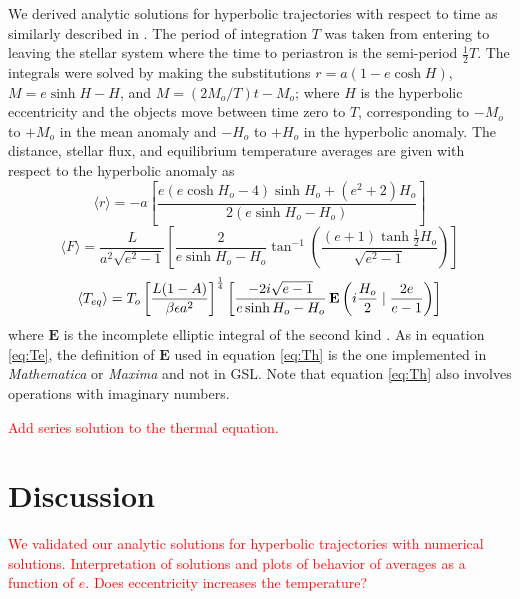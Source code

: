 \documentclass[a4paper,fleqn,usenatbib]{mnras}
\newcommand{\fix}{\textcolor{red}}
\begin{document}
We derived analytic solutions for hyperbolic trajectories with respect to time as similarly described in \citet{2017ApJ...837L...1M}. The period of integration $T$ was taken from entering to leaving the stellar system where the time to periastron is the semi-period $\frac{1}{2}T$. The integrals were solved by making the substitutions $r=a(1-e\cosh{H})$, $M=e\sinh{H} - H$, and $M=(2M_o/T)t - M_o$; where $H$ is the hyperbolic eccentricity and the objects move between time zero to $T$, corresponding to $-M_o$ to $+M_o$ in the mean anomaly and $-H_o$ to $+H_o$ in the hyperbolic anomaly. The distance, stellar flux, and equilibrium temperature averages are given with respect to the hyperbolic anomaly as
\begin{equation} \label{eq:rh}
\langle r \rangle = -a \left[\frac{e \left(e \cosh{H_o} - 4\right) \sinh{H_o} + \left(e^{2} + 2\right) H_o}{2\left(e \sinh{H_o} - H_o\right)}\right]
\end{equation}
\begin{equation} \label{eq:Fh}
\langle F \rangle = \frac{L}{a^2\sqrt{e^2 - 1}} \left[ \frac{2}{e \sinh{H_o} - H_o}\tan^{-1}\left({\frac{\left(e + 1\right) \tanh{\frac{1}{2}H_o}}{\sqrt{e^2 - 1}}}\right) \right]
\end{equation}
\begin{equation} \label{eq:Th}
\langle T_{eq} \rangle = T_o \left[\frac{L {\left(1 - A\right)}}{\beta \epsilon a^{2}}\right]^{\frac{1}{4}} \left[ \frac{-2 i \sqrt{e-1}}{e \sinh{H_o} - H_o} \, {\rm \mathbf{E}}\left(i\frac{H_o}{2} \mid \frac{2e}{e - 1}\right) \right]
\end{equation}
where $\mathbf{E}$ is the incomplete elliptic integral of the second kind \citep{MathWorld, GSL}. As in equation \ref{eq:Te}, the definition of $\mathbf{E}$ used in equation \ref{eq:Th} is the one implemented in \emph{Mathematica} or \emph{Maxima} and not in GSL. Note that equation \ref{eq:Th} also involves operations with imaginary numbers.

\fix{Add series solution to the thermal equation.}

\section{Discussion}
\label{sec:discussion}

\fix{We validated our analytic solutions for hyperbolic trajectories with numerical solutions. Interpretation of solutions and plots of behavior of averages as a function of $e$. Does eccentricity increases the temperature?}
\end{document}
